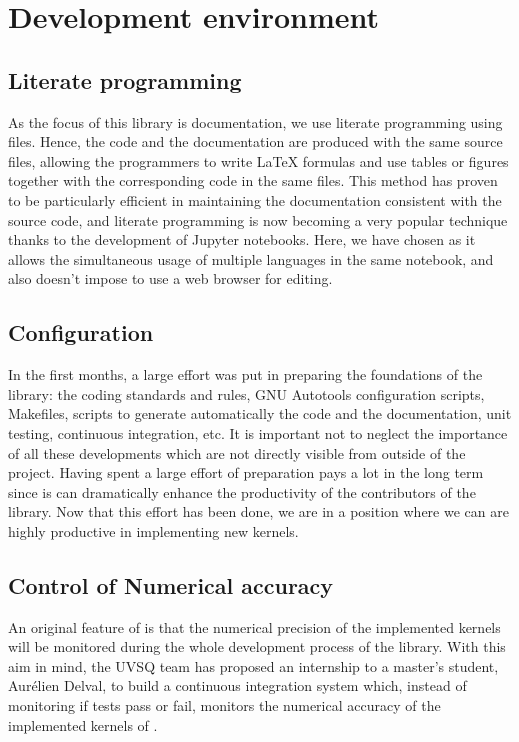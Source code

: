 \section{Development environment}

\subsection{Literate programming}

As the focus of this library is documentation, we use literate
programming using {\orgmode} files.\cite{schulte_2012,orgmode}
Hence, the code and the documentation are produced with the same
source files, allowing the programmers to write \LaTeX{} formulas and
use tables or figures together with the corresponding code in the same
files.
This method has proven to be particularly efficient in maintaining the
documentation consistent with the source code, and literate
programming is now becoming a very popular technique thanks to the
development of Jupyter notebooks.
Here, we have chosen {\orgmode} as it allows the simultaneous usage of
multiple languages in the same notebook, and also doesn't impose to
use a web browser for editing.

\subsection{Configuration}

In the first months, a large effort was put in preparing the
foundations of the library: the coding standards and rules, GNU Autotools
configuration scripts, Makefiles, scripts to generate automatically
the code and the documentation, unit testing, continuous integration,
etc. It is important not to neglect the importance of all these
developments which are not directly visible from outside of the project.
Having spent a large effort of preparation pays a lot in the long term
since is can dramatically enhance the productivity of the contributors
of the library.
Now that this effort has been done, we are in a position where we can
are highly productive in implementing new kernels.

\subsection{Control of Numerical accuracy}

An original feature of \QMCkl{} is that the numerical precision of the
implemented kernels will be monitored during the whole development
process of the library.
With this aim in mind, the \ac{UVSQ} team has proposed an internship
to a master's student, Aurélien Delval, to build a continuous
integration system which, instead of monitoring if tests pass or fail,
monitors the numerical accuracy of the implemented kernels of \QMCkl{}.

